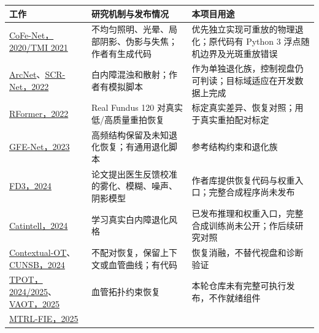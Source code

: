 \documentclass[
  10pt,
]{article}
\begin{document}
\begin{longtable}[]{@{}
  >{\raggedright\arraybackslash}p{}
  >{\raggedright\arraybackslash}p{}
  >{\raggedright\arraybackslash}p{}@{}}
\toprule\noalign{}
\begin{minipage}[b]{\linewidth}\raggedright
工作
\end{minipage} & \begin{minipage}[b]{\linewidth}\raggedright
研究机制与发布情况
\end{minipage} & \begin{minipage}[b]{\linewidth}\raggedright
本项目用途
\end{minipage} \\
\midrule\noalign{}
\endhead
\bottomrule\noalign{}
\endlastfoot
\href{https://arxiv.org/abs/2005.05594}{CoFe-Net，2020/TMI 2021} &
不均匀照明、光晕、局部阴影、伪影与失焦；作者有生成代码 &
优先独立实现可重放的物理退化；原代码有 Python 3
浮点随机边界及光斑重放错误 \\
\href{https://arxiv.org/abs/2203.07737}{ArcNet}、\href{https://arxiv.org/abs/2206.04684}{SCR-Net，2022}
& 白内障混浊和散射；作者有模拟脚本 &
作为单独退化族，控制视盘仍可判读；目标域适应在开发数据上完成 \\
\href{https://arxiv.org/abs/2201.00466}{RFormer，2022} & Real Fundus 120
对真实低/高质量重拍恢复 &
标定真实差异、恢复对照；用于真实重拍配对标定 \\
\href{https://arxiv.org/abs/2309.00885}{GFE-Net，2023} &
高频结构保留及未知退化恢复；有通用退化脚本 & 参考结构约束和退化族 \\
\href{https://arxiv.org/abs/2409.12377}{FD3，2024} &
论文提出医生反馈校准的雾化、模糊、噪声、阴影模型 &
作者库提供恢复代码与权重入口；完整合成程序尚未发布 \\
\href{https://arxiv.org/abs/2411.12278}{Catintell，2024} &
学习真实白内障退化风格 &
已发布推理和权重入口，完整合成训练尚未公开；作后续研究对照 \\
\href{https://arxiv.org/abs/2409.07862}{Contextual-OT}、\href{https://arxiv.org/abs/2409.10966}{CUNSB，2024}
& 不配对恢复，保留上下文或血管曲线；有代码 &
恢复消融，不替代视盘和诊断验证 \\
\href{https://arxiv.org/abs/2411.01403}{TPOT，2024/2025}、\href{https://arxiv.org/abs/2511.18763}{VAOT，2025}
& 血管拓扑约束恢复 & 本轮仓库未有完整可执行发布，不作就绪组件 \\
\href{https://arxiv.org/abs/2505.01831}{MTRL-FIE，2025} &

\end{longtable}
\end{document}
